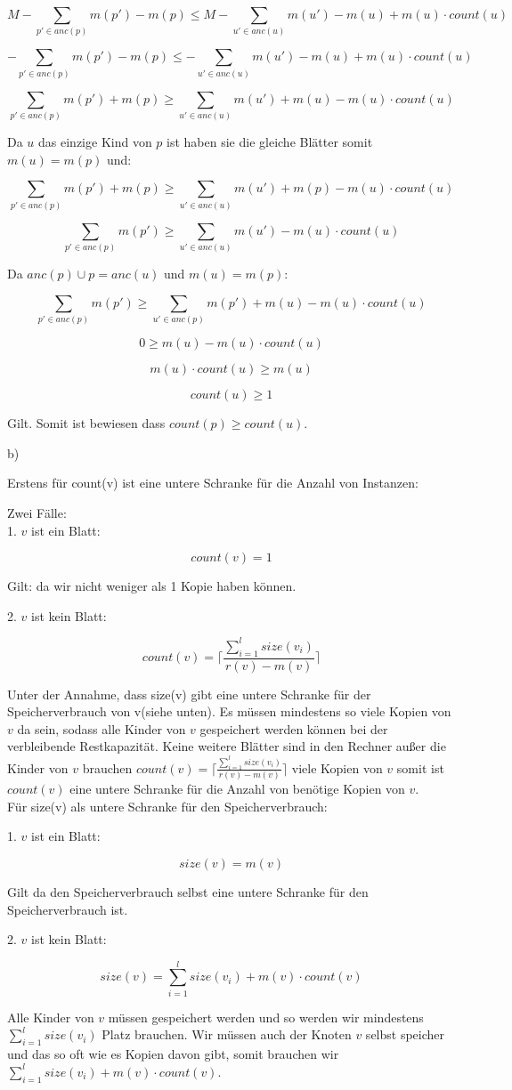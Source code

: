 \documentclass[a4paper,12pt]{scrartcl}
\begin{document}
$$ M - \sum_{p' \in anc(p)}m(p') - m(p)\leq M - \sum_{u' \in anc(u)}m(u') - m(u) + m(u)\cdot count(u)$$

$$ - \sum_{p' \in anc(p)}m(p') - m(p)\leq - \sum_{u' \in anc(u)}m(u') - m(u) + m(u)\cdot count(u)$$

$$ \sum_{p' \in anc(p)}m(p') + m(p)\geq \sum_{u' \in anc(u)}m(u') + m(u) - m(u)\cdot count(u)$$

Da $u$ das einzige Kind von $p$ ist haben sie die gleiche Blätter somit $m(u) = m(p)$ und:

$$ \sum_{p' \in anc(p)}m(p') + m(p)\geq \sum_{u' \in anc(u)}m(u') + m(p) - m(u)\cdot count(u)$$

$$ \sum_{p' \in anc(p)}m(p')\geq \sum_{u' \in anc(u)}m(u') - m(u)\cdot count(u)$$

Da $anc(p)\cup {p} = anc(u)$ und $m(u) = m(p)$:


$$ \sum_{p' \in anc(p)}m(p')\geq \sum_{u' \in anc(p)}m(p') + m(u) - m(u)\cdot count(u)$$

$$ 0 \geq m(u) - m(u)\cdot count(u)$$

$$ m(u)\cdot count(u)\geq m(u)$$

$$ count(u)\geq 1$$

Gilt. Somit ist bewiesen dass  $count(p) \geq count(u).$    

b)

Erstens für count(v) ist eine untere Schranke für die Anzahl von Instanzen:

Zwei Fälle:\\


1. $v$ ist ein Blatt:

$$count(v) = 1$$

Gilt: da wir nicht weniger als 1 Kopie haben können.

2. $v$ ist kein Blatt:

$$count(v) = \lceil {\frac{\sum_{i=1}^{l} size(v_i)}{r(v) - m(v)}}\rceil $$

Unter der Annahme, dass size(v) gibt eine untere Schranke für der Speicherverbrauch von v(siehe unten). Es müssen mindestens so viele Kopien von $v$ da sein, sodass alle Kinder von $v$ gespeichert werden können bei der verbleibende Restkapazität. Keine weitere Blätter sind in den Rechner außer die Kinder von $v$ brauchen  $count(v) = \lceil {\frac{\sum_{i=1}^{l} size(v_i)}{r(v) - m(v)}}\rceil $ viele Kopien von $v$ somit ist $count(v)$ eine untere Schranke für die Anzahl von benötige Kopien von $v$. \\

Für size(v) als untere Schranke für den Speicherverbrauch:

1. $v$ ist ein Blatt:

$$size(v) = m(v)$$

Gilt da den Speicherverbrauch selbst eine untere Schranke für den Speicherverbrauch ist.

2. $v$ ist kein Blatt:

$$size(v) = \sum_{i=1}^{l} size(v_i) + m(v)\cdot count(v)$$

Alle Kinder von $v$ müssen gespeichert werden und so werden wir mindestens $\sum_{i=1}^{l} size(v_i)$ Platz brauchen. Wir müssen auch der Knoten $v$ selbst speicher und das so oft wie es Kopien davon gibt, somit brauchen wir $\sum_{i=1}^{l} size(v_i) + m(v)\cdot count(v)$.
\end{document}
